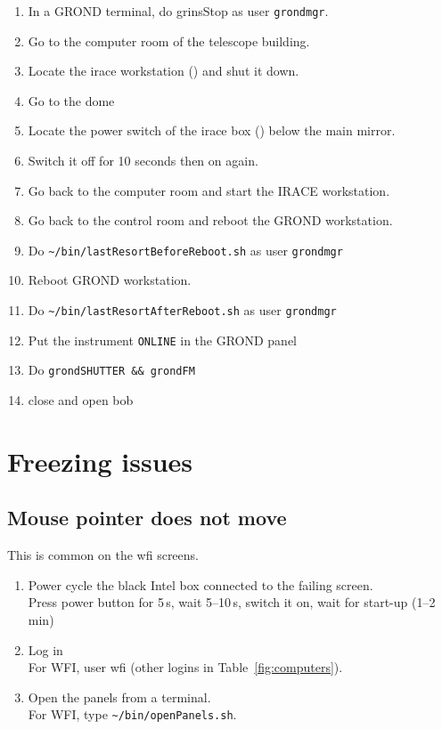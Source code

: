 \documentclass[11pt,fleqn,a4paper]{book}
\def\home{\textasciitilde{}}
\begin{document}
\label{proc:iracerestart}
\begin{enumerate}
  \item In a GROND terminal, do \gls{grinsStop} as user \texttt{grondmgr}.
  \item Go to the \gls{computer room} of the telescope building.
  \item Locate the \gls{irace} workstation () and shut it down.
  \item Go to the \gls{dome} 
  \item Locate the power switch of the \gls{irace} box () below the \gls{main mirror}.
  \item Switch it off for 10 seconds then on again.
  \item Go back to the \gls{computer room} and start the IRACE workstation.
  \item Go back to the \gls{control room} and reboot the GROND workstation.
  \item Do \texttt{\home/bin/lastResortBeforeReboot.sh} as user \texttt{grondmgr}
  \item Reboot GROND workstation.
  \item Do \texttt{\home/bin/lastResortAfterReboot.sh} as user \texttt{grondmgr}
  \item Put the instrument \texttt{ONLINE} in the GROND panel
  \item Do \texttt{grondSHUTTER \&\& grondFM}
  \item close and open bob
\end{enumerate} 

\section{Freezing issues}

\subsection{Mouse pointer does not move}
This is common on the \gls{wfi} screens.

\begin{enumerate}
    \item Power cycle the black Intel box connected to the failing screen.\\
          Press power button for 5\,s, wait 5--10\,s, switch it on, wait for
          start-up (1--2\,min)
    \item Log in\\ 
          For WFI, user wfi (other logins in Table~\ref{fig:computers}).
    \item Open the panels from a terminal.\\
          For WFI, type \texttt{\home/bin/openPanels.sh}.
\end{enumerate}
\end{document}
